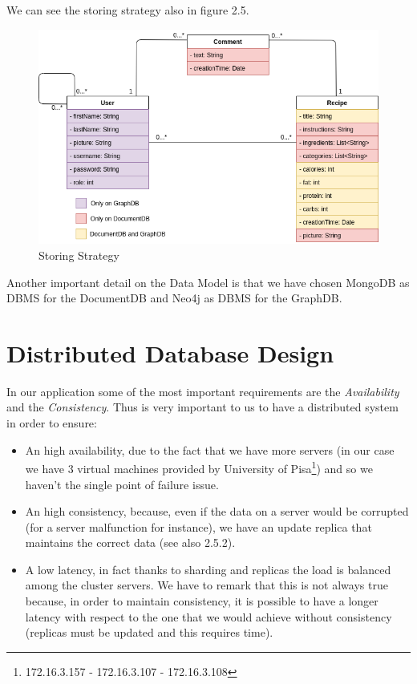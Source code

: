 \documentclass[a4paper]{report}
\begin{document}
\noindent We can see the storing strategy also in figure 2.5.

\begin{figure}[htpb]
	\centering
	\includegraphics[scale=0.5]{img/UML_colorato.png}
	\caption{Storing Strategy}
\end{figure}



\noindent Another important detail on the Data Model is that we have chosen MongoDB as DBMS for the DocumentDB and Neo4j as DBMS for the GraphDB.

\section{Distributed Database Design}
In our application some of the most important requirements are the \emph{Availability} and the \emph{Consistency}. Thus is very important to us to have a distributed system in order to ensure:
\begin{itemize}
	\item An high availability, due to the fact that we have more servers (in our case we have 3 virtual machines provided by University of Pisa\footnote{172.16.3.157 - 172.16.3.107 -  172.16.3.108}) and so we haven't the single point of failure issue.
	\item An high consistency, because, even if the data on a server would be corrupted (for a server malfunction for instance), we have an update replica that maintains the correct data (see also 2.5.2).
	\item A low latency, in fact thanks to sharding and replicas the load is balanced among the cluster servers. We have to remark that this is not always true because, in order to maintain consistency, it is possible to have a longer latency with respect to the one that we would achieve without consistency (replicas must be updated and this requires time).
\end{itemize}
\end{document}
